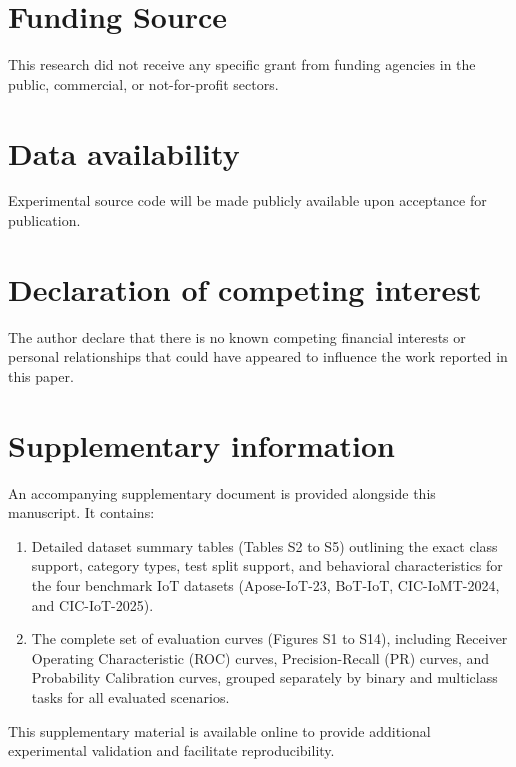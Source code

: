 \documentclass[a4paper,fleqn]{cas-sc}
\begin{document}

\section*{Funding Source}
This research did not receive any specific grant from funding agencies in the public, commercial, or not-for-profit sectors.

\section*{Data availability}
Experimental source code will be made publicly available upon acceptance for publication.

\section*{Declaration of competing interest}
The author declare that there is no known competing financial interests or personal relationships that could have appeared to influence the work reported in this paper.

\section*{Supplementary information}
An accompanying supplementary document is provided alongside this manuscript. It contains:
\begin{enumerate}
    \item Detailed dataset summary tables (Tables S2 to S5) outlining the exact class support, category types, test split support, and behavioral characteristics for the four benchmark IoT datasets (Apose-IoT-23, BoT-IoT, CIC-IoMT-2024, and CIC-IoT-2025).
    \item The complete set of evaluation curves (Figures S1 to S14), including Receiver Operating Characteristic (ROC) curves, Precision-Recall (PR) curves, and Probability Calibration curves, grouped separately by binary and multiclass tasks for all evaluated scenarios.
\end{enumerate}
This supplementary material is available online to provide additional experimental validation and facilitate reproducibility.


\printcredits

%





\end{document}
